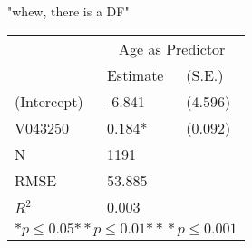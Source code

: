 \begin{Schunk}
\begin{Soutput}
[1] "whew, there is a DF"
\begin{tabular}{*{3}{l}}
\hline
                  & \multicolumn{2}{c}{Age as Predictor}   \tabularnewline
                   &Estimate  &(S.E.)  \tabularnewline
 \hline
 \hline
   (Intercept)     &-6.841   &   (4.596) \tabularnewline
   V043250         &0.184*   &   (0.092) \tabularnewline
 \hline
 N                 &1191       &        \tabularnewline
 RMSE             &53.885         & \tabularnewline
 $R^2$             &0.003         & \tabularnewline
 \hline
\hline
 
 \multicolumn{3}{c}{${*  p}\le 0.05$${*\!\!*  p}\le 0.01$${*\!\!*\!\!*  p}\le 0.001$}\tabularnewline
 \end{tabular}
\end{Soutput}
\end{Schunk}
